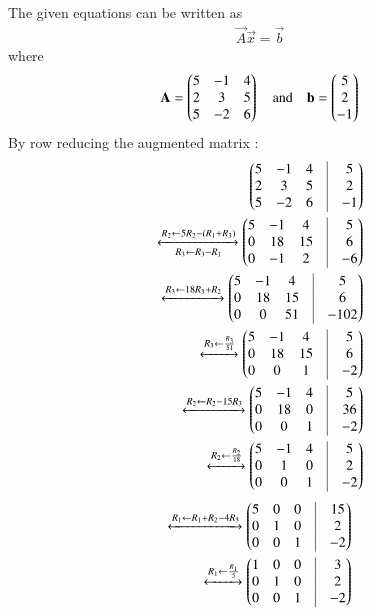 	The given equations can be written as
\begin{align*}
	\vec{A} \vec{x} = \vec{b}  
\end{align*}
where
\begin{align}
	\mathbf{A} = \begin{pmatrix} 5 & -1 & 4 \\ 2 &  3 & 5 \\ 5 & -2 & 6 \end{pmatrix}
	\quad \text{and} \quad
	\mathbf{b} = \begin{pmatrix} 5 \\  2 \\ -1\end{pmatrix}
\end{align}
By row reducing the augmented matrix :
\begin{align}
	\myvec{ 5 & -1 & 4 &\vrule & 5 \\ 2 & 3 & 5 &\vrule & 2 \\ 5 & -2 & 6 &\vrule & -1}
	\\
	\xleftrightarrow[R_3 \leftarrow R_3-R_1]{R_2 \leftarrow 5R_2-(R_1+R_3)}
	\myvec{5 &-1  & 4  &\vrule & 5 \\ 0 & 18 & 15 &\vrule & 6 \\ 0 & -1 & 2 &\vrule & -6}
	\\
	\xleftrightarrow[]{R_3 \leftarrow 18R_3+R_2}
	\myvec{5 & -1 &  4 &\vrule & 5 \\ 0 & 18 & 15 &\vrule & 6 \\ 0 & 0 & 51 &\vrule & -102}
	\\
	\xleftrightarrow[]{R_3 \leftarrow \frac{R_3}{51}}
	\myvec{5 & -1 &  4 &\vrule & 5 \\ 0 & 18 & 15 &\vrule & 6 \\ 0 & 0 & 1 &\vrule & -2}
	\\
	\xleftrightarrow[]{R_2 \leftarrow R_2-15 R_3}
	\myvec{5 & -1 &  4 &\vrule & 5 \\ 0 & 18 & 0 &\vrule & 36 \\ 0 & 0 & 1 &\vrule & -2}
	\\
	\xleftrightarrow[]{R_2 \leftarrow \frac{R_2}{18}}
	\myvec{5 & -1 &  4 &\vrule & 5 \\ 0 & 1 & 0 &\vrule & 2 \\ 0 & 0 & 1 &\vrule & -2}
\end{align}
\begin{align}
	\xleftrightarrow[]{R_1 \leftarrow R_1+R_2-4 R_3}
	\myvec{5 & 0 &  0 &\vrule & 15 \\ 0 & 1 & 0 &\vrule & 2 \\ 0 & 0 & 1 &\vrule & -2}
	\\
	\xleftrightarrow[]{R_1 \leftarrow \frac{R_1}{5}}
	\myvec{1 & 0 &  0 &\vrule & 3 \\ 0 & 1 & 0 &\vrule & 2 \\ 0 & 0 & 1 &\vrule & -2}
\end{align}

